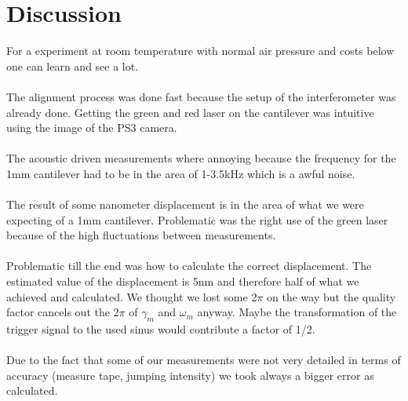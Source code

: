 \documentclass[12pt,a4paper]{article}
\begin{document}
\section{Discussion}
For a experiment at room temperature with normal air pressure and costs below  one can learn and see a lot. \\
\\
The alignment process was done fast because the setup of the interferometer was already done. Getting the green and red laser on the cantilever was intuitive using the image of the PS3 camera. \\
\\
The acoustic driven measurements where annoying because the frequency for the 1mm cantilever had to be in the area of 1-3.5kHz which is a awful noise.\\
\\
The result of some nanometer displacement is in the area of what we were expecting of a 1mm cantilever. Problematic was the right use of the green laser because of the high fluctuations between measurements.\\
\\
Problematic till the end was how to calculate the correct displacement. The estimated value of the displacement is 5nm and therefore half of what we achieved and calculated. We thought we lost some 2$\pi$ on the way but the quality factor cancels out the 2$\pi$ of $\gamma_m$ and $\omega_m$ anyway. Maybe the transformation of the trigger signal to the used sinus would contribute a factor of 1/2.\\
\\
Due to the fact that some of our measurements were not very detailed in terms of accuracy (measure tape, jumping intensity) we took always a bigger error as calculated.\\






\end{document}
